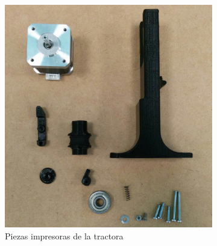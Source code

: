 \begin{figure}[H]
                      \centering
                        \begin{subfigure}[b]{0.3\textwidth}
                            \centering
                            \includegraphics[width=\linewidth]{images/producciones/tractora/IMG_20150804_085937.jpg}
                            \caption{Piezas impresoras de la tractora}
                            \label{fig:tractora_piezas}
                        \end{subfigure}
                        ~
                        \begin{subfigure}[b]{0.3\textwidth}
                                \centering

\end{subfigure}
\end{figure}
